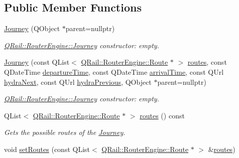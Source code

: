 \subsection*{Public Member Functions}
\begin{DoxyCompactItemize}
\item 
\mbox{\hyperlink{classQRail_1_1RouterEngine_1_1Journey_af49050161e106f4c47cbddc8d82ebaa0}{Journey}} (Q\+Object $\ast$parent=nullptr)
\begin{DoxyCompactList}\small\item\em \mbox{\hyperlink{classQRail_1_1RouterEngine_1_1Journey}{Q\+Rail\+::\+Router\+Engine\+::\+Journey}} constructor\+: empty. \end{DoxyCompactList}\item 
\mbox{\hyperlink{classQRail_1_1RouterEngine_1_1Journey_ac9eff966320fdad0ebdd48e06e42faab}{Journey}} (const Q\+List$<$ \mbox{\hyperlink{classQRail_1_1RouterEngine_1_1Route}{Q\+Rail\+::\+Router\+Engine\+::\+Route}} $\ast$ $>$ \mbox{\hyperlink{classQRail_1_1RouterEngine_1_1Journey_ac1ead02119493cf91dc47f867034108e}{routes}}, const Q\+Date\+Time \mbox{\hyperlink{classQRail_1_1RouterEngine_1_1Journey_a58b92b24d9d29ebb3cb47994b92eaa13}{departure\+Time}}, const Q\+Date\+Time \mbox{\hyperlink{classQRail_1_1RouterEngine_1_1Journey_a8a4e6733fceea2902fc3b0f5cb6b077c}{arrival\+Time}}, const Q\+Url \mbox{\hyperlink{classQRail_1_1RouterEngine_1_1Journey_af2e3a86d876b397e5a88b89aea673145}{hydra\+Next}}, const Q\+Url \mbox{\hyperlink{classQRail_1_1RouterEngine_1_1Journey_a670dbe08bcc3ce8e8003a0429661e18f}{hydra\+Previous}}, Q\+Object $\ast$parent=nullptr)
\begin{DoxyCompactList}\small\item\em \mbox{\hyperlink{classQRail_1_1RouterEngine_1_1Journey}{Q\+Rail\+::\+Router\+Engine\+::\+Journey}} constructor\+: empty. \end{DoxyCompactList}\item 
Q\+List$<$ \mbox{\hyperlink{classQRail_1_1RouterEngine_1_1Route}{Q\+Rail\+::\+Router\+Engine\+::\+Route}} $\ast$ $>$ \mbox{\hyperlink{classQRail_1_1RouterEngine_1_1Journey_ac1ead02119493cf91dc47f867034108e}{routes}} () const
\begin{DoxyCompactList}\small\item\em Gets the possible routes of the \mbox{\hyperlink{classQRail_1_1RouterEngine_1_1Journey}{Journey}}. \end{DoxyCompactList}\item 
void \mbox{\hyperlink{classQRail_1_1RouterEngine_1_1Journey_a99468617b683a7f07de157b30d1b9048}{set\+Routes}} (const Q\+List$<$ \mbox{\hyperlink{classQRail_1_1RouterEngine_1_1Route}{Q\+Rail\+::\+Router\+Engine\+::\+Route}} $\ast$ $>$ \&\mbox{\hyperlink{classQRail_1_1RouterEngine_1_1Journey_ac1ead02119493cf91dc47f867034108e}{routes}})

\end{DoxyCompactItemize}
